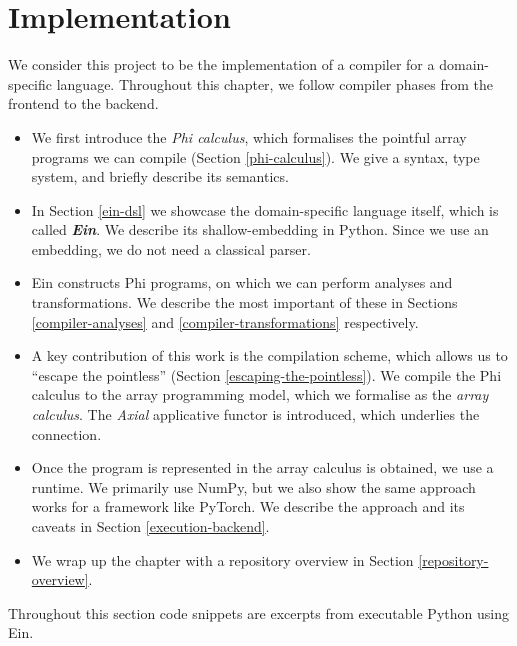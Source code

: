 \chapter{Implementation}

We consider this project to be the implementation of a compiler for a domain-specific language. Throughout this chapter, we follow compiler phases from the frontend to the backend. 
\begin{itemize}
    \item We first introduce the \textit{Phi calculus}, which formalises the pointful array programs we can compile (Section \ref{phi-calculus}). We give a syntax, type system, and briefly describe its semantics.
    \item In Section \ref{ein-dsl} we showcase the domain-specific language itself, which is called \textit{\textbf{Ein}}. We describe its shallow-embedding in Python. Since we use an embedding, we do not need a classical parser.
    \item Ein constructs Phi programs, on which we can perform analyses and transformations. We describe the most important of these in Sections \ref{compiler-analyses} and \ref{compiler-transformations} respectively.
    \item A key contribution of this work is the compilation scheme, which allows us to ``escape the pointless'' (Section \ref{escaping-the-pointless}). We compile the Phi calculus to the array programming model, which we formalise as the \textit{array calculus}. The \textit{Axial} applicative functor is introduced, which underlies the connection.
    \item Once the program is represented in the array calculus is obtained, we use a runtime. We primarily use NumPy, but we also show the same approach works for a framework like PyTorch. We describe the approach and its caveats in Section \ref{execution-backend}.
    \item We wrap up the chapter with a repository overview in Section \ref{repository-overview}.
\end{itemize}
Throughout this section code snippets are excerpts from executable Python using Ein. 


